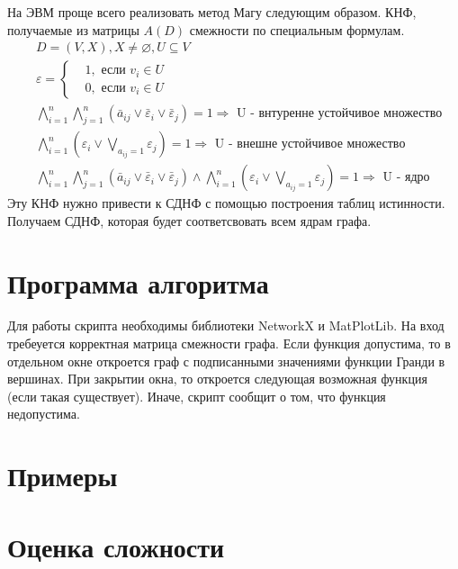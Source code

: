 \documentclass[12pt, letterpaper, titlepage]{article}
\let\emptyset\varnothing
\begin{document}
На ЭВМ проще всего реализовать метод Магу следующим образом. КНФ, получаемые из матрицы $A(D)$ смежности по специальным формулам.
\[
    \begin{split}
        &D = (V,X), X \neq \emptyset, U \subseteq V\\
        &\varepsilon = 
        \begin{cases}
            &1, \text{ если } v_i \in U\\
            &0, \text{ если } v_i \in U
        \end{cases}\\
        &\bigwedge_{i=1}^{n}\bigwedge_{j=1}^{n}(\bar a_{ij} \vee \bar \varepsilon_i \vee \bar \varepsilon_j) = 1 \Rightarrow \text{ U - внтуренне устойчивое множество}\\
        &\bigwedge_{i=1}^{n}(\varepsilon_i \vee \bigvee_{a_{ij}=1} \varepsilon_j) = 1 \Rightarrow \text{ U - внешне устойчивое множество}\\
        &\bigwedge_{i=1}^{n}\bigwedge_{j=1}^{n}(\bar a_{ij} \vee \bar \varepsilon_i \vee \bar \varepsilon_j) \wedge \bigwedge_{i=1}^{n}(\varepsilon_i \vee \bigvee_{a_{ij}=1} \varepsilon_j) = 1 \Rightarrow \text{ U - ядро}
    \end{split}
\]
Эту КНФ нужно привести к СДНФ с помощью построения таблиц истинности. Получаем СДНФ, которая будет соответсвовать всем ядрам графа.
\section{Программа алгоритма}
Для работы скрипта необходимы библиотеки NetworkX и MatPlotLib. На вход требеуется корректная матрица смежности графа.
Если функция допустима, то в отдельном окне откроется граф с подписанными значениями функции Гранди в вершинах. При закрытии окна, то откроется следующая возможная функция (если такая существует).
Иначе, скрипт сообщит о том, что функция недопустима.

\section{Примеры}
\section{Оценка сложности}
\end{document}
